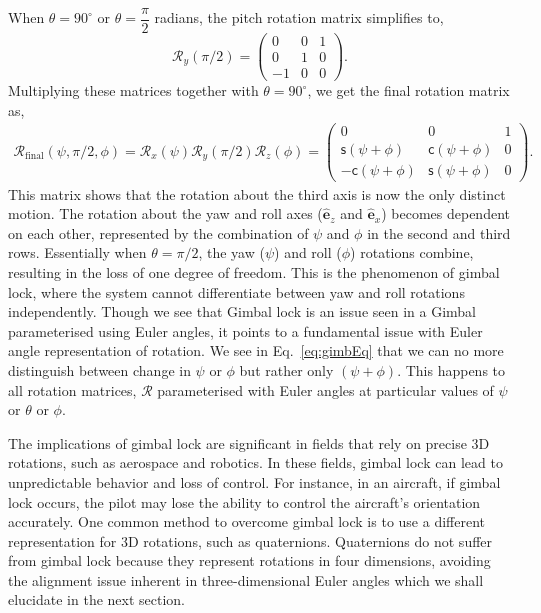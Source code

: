 \documentclass{article}
\def\eh{\hat{\mathbf{e}}}
\def\R{\mathcal{R}}
\def\c{\textsf{c}}
\def\s{\textsf{s}}
\begin{document}
\noindent When \(\theta = 90^\circ\) or \(\theta = \dfrac{\pi}{2}\) radians, the pitch rotation matrix simplifies to,
\[
\R_{y}(\pi/2) = 
\begin{pmatrix}
0 & 0 & 1 \\
0 & 1 & 0 \\
-1 & 0 & 0
\end{pmatrix}.
\]
Multiplying these matrices together with \(\theta = 90^\circ\), we get the final rotation matrix as,
\begin{align}
\R_{\text{final}} (\psi, \pi/2, \phi) = \R_{x}(\psi) \R_{y}(\pi/2) \R_{z}(\phi) = 
\begin{pmatrix}
0 & 0 & 1 \\
\s(\psi + \phi) & \c(\psi + \phi) & 0 \\
-\c(\psi + \phi) & \s(\psi + \phi) & 0
\end{pmatrix}. \label{eq:gimbEq}
\end{align}
This matrix shows that the rotation about the third axis is now the only distinct motion. The rotation about the yaw and roll axes ($\eh_z$ and $\eh_x$) becomes dependent on each other, represented by the combination of \(\psi\) and \(\phi\) in the second and third rows. Essentially when \(\theta = \pi/2\), the yaw (\(\psi\)) and roll (\(\phi\)) rotations combine, resulting in the loss of one degree of freedom. This is the phenomenon of gimbal lock, where the system cannot differentiate between yaw and roll rotations independently. Though we see that Gimbal lock is an issue seen in a Gimbal parameterised using Euler angles, it points to a fundamental issue with Euler angle representation of rotation. We see in Eq.~\ref{eq:gimbEq} that we can no more distinguish between change in $\psi$ or $\phi$ but rather only $(\psi + \phi)$. This happens to all rotation matrices, $\R$ parameterised with Euler angles at particular values of $\psi$ or $\theta$ or $\phi$.

The implications of gimbal lock are significant in fields that rely on precise 3D rotations, such as aerospace and robotics. In these fields, gimbal lock can lead to unpredictable behavior and loss of control. For instance, in an aircraft, if gimbal lock occurs, the pilot may lose the ability to control the aircraft's orientation accurately. One common method to overcome gimbal lock is to use a different representation for 3D rotations, such as quaternions. Quaternions do not suffer from gimbal lock because they represent rotations in four dimensions, avoiding the alignment issue inherent in three-dimensional Euler angles which we shall elucidate in the next section.
\end{document}

